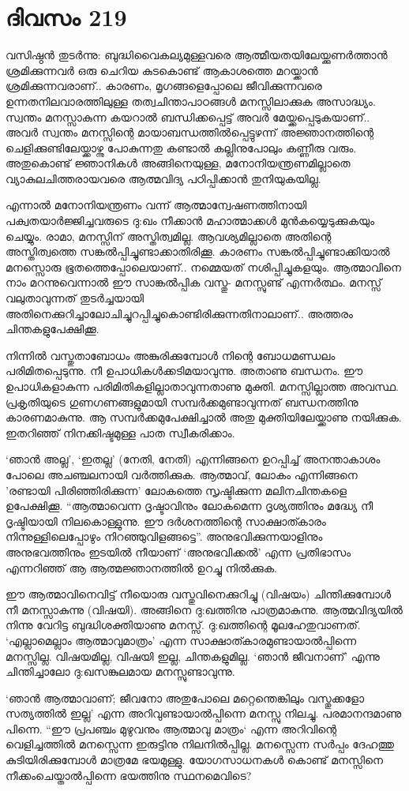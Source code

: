 \section{ദിവസം 219}


വസിഷ്ഠൻ തുടർന്നു: ബുദ്ധിവൈകല്യമുള്ളവരെ ആത്മീയതയിലേയ്ക്കുണര്‍ത്താന്‍ ശ്രമിക്കുന്നവർ ഒരു ചെറിയ കുടകൊണ്ട് ആകാശത്തെ മറയ്ക്കാൻ ശ്രമിക്കുന്നവരാണ്‌.. കാരണം, മൃഗങ്ങളെപ്പോലെ ജീവിക്കുന്നവരെ ഉന്നതനിലവാരത്തിലുള്ള തത്വചിന്താപാഠങ്ങള്‍ മനസ്സിലാക്കുക അസാദ്ധ്യം. സ്വന്തം മനസ്സാകുന്ന കയറാൽ ബന്ധിക്കപ്പെട്ട് അവർ മേയ്ക്കപ്പെടുകയാണ്‌.. അവർ സ്വന്തം മനസ്സിന്റെ മായാബന്ധത്തിൽപ്പെട്ടുഴന്ന് അജ്ഞാനത്തിന്റെ ചെളിക്കുണ്ടിലേയ്ക്കാഴ്ന്നു പോകുന്നതു കണ്ടാൽ കല്ലിനുപോലും കണ്ണീരു വരും. അതുകൊണ്ട് ജ്ഞാനികൾ അങ്ങിനെയുള്ള, മനോനിയന്ത്രണമില്ലാതെ വ്യാകുലചിത്തരായവരെ ആത്മവിദ്യ പഠിപ്പിക്കാൻ തുനിയുകയില്ല.

എന്നാൽ മനോനിയന്ത്രണം വന്ന് ആത്മാന്വേഷണത്തിനായി പക്വതയാർജ്ജിച്ചവരുടെ ദു:ഖം നീക്കാൻ മഹാത്മാക്കൾ മുൻകയ്യെടുക്കുകയും ചെയ്യും. രാമാ, മനസ്സിന്‌ അസ്തിത്വമില്ല. ആവശ്യമില്ലാതെ അതിന്റെ അസ്തിത്വത്തെ സങ്കൽപ്പിച്ചുണ്ടാക്കാതിരിക്കൂ. കാരണം സങ്കൽപ്പിച്ചുണ്ടാക്കിയാല്‍ മനസ്സൊരു ഭൂതത്തെപ്പോലെയാണ്‌.. നമ്മെയത് നശിപ്പിച്ചുകളയും. ആത്മാവിനെ നാം മറന്നുവെന്നാൽ ഈ സാങ്കൽപ്പിക വസ്തു- മനസ്സുണ്ട് എന്നർത്ഥം. മനസ്സ് വലുതാവുന്നത് തുടർച്ചയായി അതിനെക്കുറിച്ചാലോചിച്ചുറപ്പിച്ചുകൊണ്ടിരിക്കുന്നതിനാലാണ്‌.. അത്തരം ചിന്തകളുപേക്ഷിക്കൂ.

നിന്നിൽ വസ്തുതാബോധം അങ്കുരിക്കുമ്പോൾ നിന്റെ ബോധമണ്ഡലം പരിമിതപ്പെടുന്നു. നീ ഉപാധികൾക്കടിമയാവുന്നു. അതാണു ബന്ധനം. ഈ ഉപാധികളാകുന്ന  പരിമിതികളില്ലാതാവുന്നതാണു മുക്തി. മനസ്സില്ലാത്ത അവസ്ഥ. പ്രകൃതിയുടെ ഗുണഗണങ്ങളുമായി സമ്പർക്കമുണ്ടാവുന്നത് ബന്ധനത്തിനു കാരണമാകുന്നു. ആ സമ്പർക്കമുപേക്ഷിച്ചാൽ അതു മുക്തിയിലേയ്ക്കാണു നയിക്കുക. ഇതറിഞ്ഞ് നിനക്കിഷ്ടമുള്ള പാത സ്വീകരിക്കാം.

‘ഞാൻ അല്ല’, ‘ഇതല്ല’ (നേതി, നേതി) എന്നിങ്ങനെ ഉറപ്പിച്ച് അനന്താകാശം പോലെ അചഞ്ചലനായി വർത്തിക്കുക. ആത്മാവ്, ലോകം എന്നിങ്ങനെ 'രണ്ടായി പിരിഞ്ഞിരിക്കുന്ന' ലോകത്തെ സൃഷ്ടിക്കുന്ന മലിനചിന്തകളെ ഉപേക്ഷിക്കൂ. “ആത്മാവെന്ന ദൃഷ്ടാവിനും ലോകമെന്ന ദൃശ്യത്തിനും മദ്ധ്യേ നീ ദൃഷ്ടിയായി നിലകൊള്ളുന്നു. ഈ ദർശനത്തിന്റെ സാക്ഷാത്കാരം നിന്നുള്ളിലെപ്പോഴും നിറഞ്ഞുവിളങ്ങട്ടെ”. അനുഭവിക്കുന്നയാളിനും അനുഭവത്തിനും ഇടയിൽ നീയാണ്‌ ‘അനുഭവിക്കൽ’ എന്ന പ്രതിഭാസം എന്നറിഞ്ഞ് ആ ആത്മജ്ഞാനത്തിൽ ഉറച്ചു നിൽക്കുക.

ഈ ആത്മാവിനെവിട്ട് നീയൊരു വസ്തുവിനെക്കുറിച്ചു (വിഷയം) ചിന്തിക്കുമ്പോൾ നീ മനസ്സാകുന്നു (വിഷയി). അങ്ങിനെ ദു:ഖത്തിനു പാത്രമാകുന്നു. ആത്മവിദ്യയിൽ നിന്നു വേറിട്ട ബുദ്ധിശക്തിയാണു മനസ്സ്. ദു:ഖത്തിന്റെ മൂലഹേതുവാണത്. ‘എല്ലാമെല്ലാം ആത്മാവുമാത്രം’ എന്ന സാക്ഷാത്കാരമുണ്ടായാൽപ്പിന്നെ മനസ്സില്ല. വിഷയമില്ല, വിഷയി ഇല്ല, ചിന്തകളുമില്ല. ‘ഞാൻ ജീവനാണ്‌’ എന്നു ചിന്തിച്ചാലോ ദു:ഖസങ്കുലമായ മനസ്സുണ്ടാവുന്നു.

‘ഞാൻ ആത്മാവാണ്‌; ജീവനോ അതുപോലെ മറ്റെന്തെങ്കിലും വസ്തുക്കളോ സത്യത്തിൽ ഇല്ല’ എന്ന അറിവുണ്ടായാൽപ്പിന്നെ മനസ്സു നിലച്ചു. പരമാനന്ദമാണു പിന്നെ. “ഈ പ്രപഞ്ചം മുഴുവനും ആത്മാവു മാത്രം‘ എന്ന അറിവിന്റെ വെളിച്ചത്തിൽ മനസ്സെന്ന ഇരുട്ടിനു നിലനിൽപ്പില്ല. മനസ്സെന്ന സർപ്പം ദേഹത്തു കുടിയിരിക്കുമ്പോൾ മാത്രമേ ഭയമുള്ളു. യോഗസാധനകൾ കൊണ്ട് മനസ്സിനെ നീക്കംചെയ്താൽപ്പിന്നെ ഭയത്തിനു സ്ഥനമെവിടെ? 


